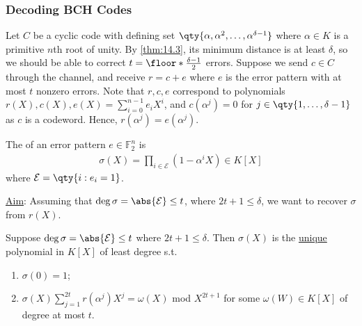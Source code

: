 \subsubsection{Decoding BCH Codes}

Let $C$ be a cyclic code with defining set $\qty{\alpha, \alpha^2, \dots, \alpha^{\delta - 1}}$ where $\alpha \in K$ is a primitive $n$th root of unity.
By \cref{thm:14.3}, its minimum distance is at least $\delta$, so we should be able to correct $t = \floor*{\frac{\delta - 1}{2}}$ errors.
Suppose we send $c \in C$ through the channel, and receive $r = c + e$ where $e$ is the error pattern with at most $t$ nonzero errors.
Note that $r, c, e$ correspond to polynomials $r(X), c(X), e(X) = \sum_{i=0}^{n-1} e_i X^i$, and $c(\alpha^j) = 0$ for $j \in \qty{1, \dots, \delta - 1}$ as $c$ is a codeword.
Hence, $r(\alpha^j) = e(\alpha^j)$.

\begin{definition}
    The  of an error pattern $e \in \mathbb F_2^n$ is
    \begin{align*}
        \sigma(X) = \prod_{i \in \mathcal E} (1 - \alpha^i X) \in K[X]
    \end{align*}
    where $\mathcal E = \qty{i : e_i = 1}$.
\end{definition}

\underline{Aim}: Assuming that $\deg \sigma = \abs{\mathcal E} \leq t$, where $2t + 1 \leq \delta$, we want to recover $\sigma$ from $r(X)$.

\begin{theorem}
    Suppose $\deg \sigma = \abs{\mathcal E} \leq t$ where $2t + 1 \leq \delta$.
    Then $\sigma(X)$ is the \underline{unique} polynomial in $K[X]$ of least degree s.t.
    \begin{enumerate}
        \item $\sigma(0) = 1$;
        \item $\sigma(X) \sum_{j=1}^{2t} r(\alpha^j) X^j = \omega(X)$ mod $X^{2t+1}$ for some $\omega(W) \in K[X]$ of degree at most $t$.
    \end{enumerate}
\end{theorem}

